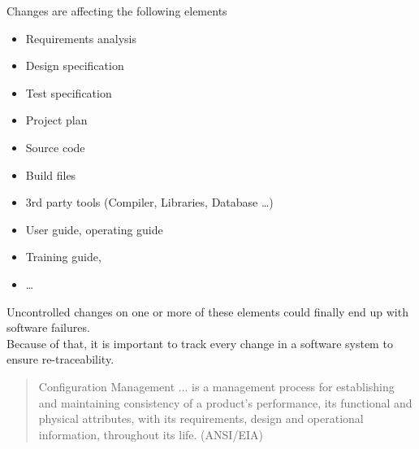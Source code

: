 \newslide
Changes are affecting the following elements
\begin{itemize}
\item Requirements analysis
\item Design specification
\item Test specification
\item Project plan
\item Source code
\item Build files
\item 3rd party tools (Compiler, Libraries, Database \ldots)
\item User guide, operating guide
\item Training guide,
\item \ldots
\end{itemize}

Uncontrolled changes on one or more of these elements could finally end
up with software failures.\\


Because of that, it is important to track every change in a software system
to ensure re-traceability.

\begin{quote}
Configuration Management ... is a management process for establishing and
maintaining consistency of a product's performance, its functional and
physical attributes, with its requirements, design and operational
information, throughout its life. (ANSI/EIA)
\end{quote}
\newpage
